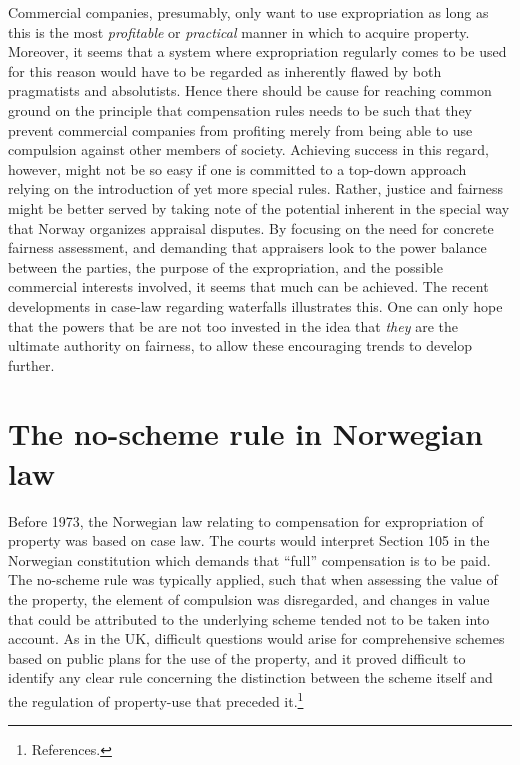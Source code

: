 Commercial companies, presumably, only want to use expropriation as long as this is the most \emph{profitable} or \emph{practical} manner in which to acquire property. Moreover, it seems that a system where expropriation regularly comes to be used for this reason would have to be regarded as inherently flawed by both pragmatists and absolutists. Hence there should be cause for reaching common ground on the principle that compensation rules needs to be such that they prevent commercial companies from profiting merely from being able to use compulsion against other members of society. Achieving success in this regard, however, might not be so easy if one is committed to a top-down approach relying on the introduction of yet more special rules. Rather, justice and fairness might be better served by taking note of the potential inherent in the special way that Norway organizes appraisal disputes. By focusing on the need for concrete fairness assessment, and demanding that appraisers look to the power balance between the parties, the purpose of the expropriation, and the possible commercial interests involved, it seems that much can be achieved. The recent developments in case-law regarding waterfalls illustrates this. One can only hope that the powers that be are not too invested in the idea that \emph{they} are the ultimate authority on fairness, to allow these 
encouraging trends to develop further.

\section{The no-scheme rule in Norwegian law}\label{sec:nonor}

Before 1973, the Norwegian law relating to compensation for expropriation of property was based on case law. The courts would interpret Section 105 in the Norwegian constitution which demands that ``full'' compensation is to be paid. The no-scheme rule was typically applied, such that when assessing the value of the property, the element of compulsion was disregarded, and changes in value that could be attributed to the underlying scheme tended not to be taken into account. As in the UK, difficult questions would arise for comprehensive schemes based on public plans for the use of the property, and it proved difficult to identify any clear rule concerning the distinction between the scheme itself and the regulation of property-use that preceded it.\footnote{References.}

